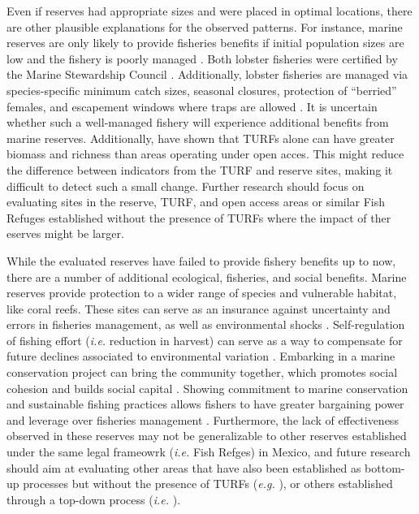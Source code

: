 \documentclass{frontiersSCNS}
\theoremstyle{definition}
\theoremstyle{definition}
\theoremstyle{definition}
\theoremstyle{remark}
\begin{document}
Even if reserves had appropriate sizes and were placed in optimal
locations, there are other plausible explanations for the observed
patterns. For instance, marine reserves are only likely to provide
fisheries benefits if initial population sizes are low and the fishery
is poorly managed \citep{hilborn_2006}. Both lobster fisheries were
certified by the Marine Stewardship Council \citep{prezramrez_2016-J1}.
Additionally, lobster fisheries are managed via species-specific minimum
catch sizes, seasonal closures, protection of ``berried'' females, and
escapement windows where traps are allowed \citep{dof_website_1993}. It
is uncertain whether such a well-managed fishery will experience
additional benefits from marine reserves. Additionally,
\citet{gelcich_2008} have shown that TURFs alone can have greater
biomass and richness than areas operating under open acces. This might
reduce the difference between indicators from the TURF and reserve
sites, making it difficult to detect such a small change. Further
research should focus on evaluating sites in the reserve, TURF, and open
access areas or similar Fish Refuges established without the presence of
TURFs where the impact of ther eserves might be larger.

While the evaluated reserves have failed to provide fishery benefits up
to now, there are a number of additional ecological, fisheries, and
social benefits. Marine reserves provide protection to a wider range of
species and vulnerable habitat, like coral reefs. These sites can serve
as an insurance against uncertainty and errors in fisheries management,
as well as environmental shocks
\citep{hilborn_2004,hilborn_2006,micheli_2012-EU,aalto}. Self-regulation
of fishing effort (\emph{i.e.} reduction in harvest) can serve as a way
to compensate for future declines associated to environmental variation
\citep{finkbeiner_2018}. Embarking in a marine conservation project can
bring the community together, which promotes social cohesion and builds
social capital \citep{fulton_2019}. Showing commitment to marine
conservation and sustainable fishing practices allows fishers to have
greater bargaining power and leverage over fisheries management
\citep{prezramrez_2012}. Furthermore, the lack of effectiveness observed
in these reserves may not be generalizable to other reserves established
under the same legal frameowrk (\emph{i.e.} Fish Refges) in Mexico, and
future research should aim at evaluating other areas that have also been
established as bottom-up processes but without the presence of TURFs
(\emph{e.g.} \citet{dof_websiteC_2012}), or others established through a
top-down process (\emph{i.e.} \citet{dof_websiteU_2018}).
\end{document}

